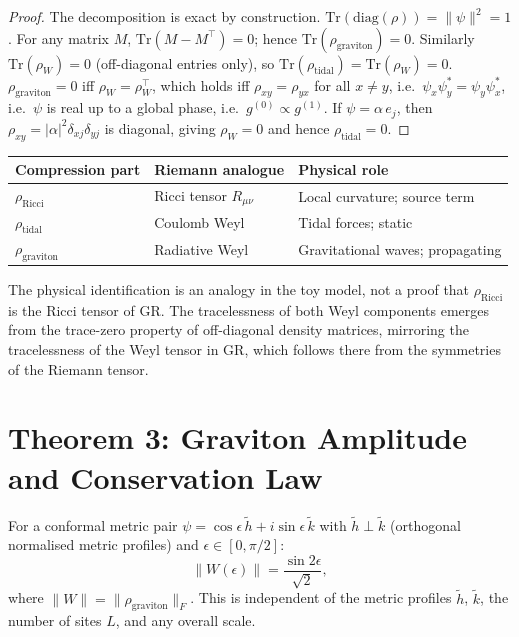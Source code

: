 \documentclass[11pt]{article}
\begin{document}
\begin{proof}
The decomposition is exact by construction.
$\mathrm{Tr}(\mathrm{diag}(\rho)) = \|\psi\|^2 = 1$.
For any matrix $M$, $\mathrm{Tr}(M - M^\top) = 0$; hence
$\mathrm{Tr}(\rho_{\mathrm{graviton}}) = 0$.
Similarly $\mathrm{Tr}(\rho_W) = 0$ (off-diagonal entries only), so
$\mathrm{Tr}(\rho_{\mathrm{tidal}}) = \mathrm{Tr}(\rho_W) = 0$.
$\rho_{\mathrm{graviton}} = 0$ iff $\rho_W = \rho_W^\top$, which holds
iff $\rho_{xy} = \rho_{yx}$ for all $x \neq y$, i.e.\
$\psi_x\psi_y^* = \psi_y\psi_x^*$, i.e.\ $\psi$ is real up to a global
phase, i.e.\ $g^{(0)} \propto g^{(1)}$.
If $\psi = \alpha\,e_j$, then $\rho_{xy} = |\alpha|^2\delta_{xj}\delta_{yj}$
is diagonal, giving $\rho_W = 0$ and hence $\rho_{\mathrm{tidal}} = 0$.
\end{proof}

\begin{center}
\begin{tabular}{lll}
\toprule
\textbf{Compression part} & \textbf{Riemann analogue} &
\textbf{Physical role} \\
\midrule
$\rho_{\mathrm{Ricci}}$    & Ricci tensor $R_{\mu\nu}$ &
  Local curvature; source term \\
$\rho_{\mathrm{tidal}}$    & Coulomb Weyl &
  Tidal forces; static \\
$\rho_{\mathrm{graviton}}$ & Radiative Weyl &
  Gravitational waves; propagating \\
\bottomrule
\end{tabular}
\end{center}

The physical identification is an analogy in the toy model, not a
proof that $\rho_{\mathrm{Ricci}}$ is the Ricci tensor of GR.
The tracelessness of both Weyl components emerges from the trace-zero
property of off-diagonal density matrices, mirroring the tracelessness
of the Weyl tensor in GR, which follows there from the symmetries of
the Riemann tensor.

\section{Theorem 3: Graviton Amplitude and Conservation Law}
\label{sec:amplitude}

\begin{theorem}
\label{thm:amplitude}
For a conformal metric pair
$\psi = \cos\epsilon\,\tilde{h} + i\sin\epsilon\,\tilde{k}$
with $\tilde{h} \perp \tilde{k}$ (orthogonal normalised metric
profiles) and $\epsilon \in [0,\pi/2]$:
\[
  \boxed{\|W(\epsilon)\| = \frac{\sin 2\epsilon}{\sqrt{2}},}
\]
where $\|W\| = \|\rho_{\mathrm{graviton}}\|_F$.
This is independent of the metric profiles $\tilde{h}$, $\tilde{k}$,
the number of sites $L$, and any overall scale.
\end{theorem}
\end{document}
